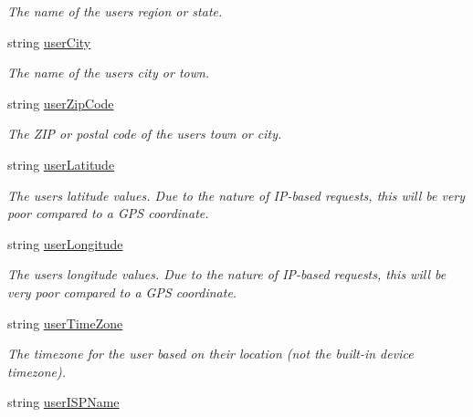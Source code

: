 \begin{DoxyCompactItemize}
\begin{DoxyCompactList}\small\item\em The name of the user\textquotesingle{}s region or state. \end{DoxyCompactList}\item 
string \mbox{\hyperlink{class_bigfoot_d_s_1_1_bigfoot_general_location_finder_a05f1fa53a9892d4de8103fbe16858db2}{user\+City}}
\begin{DoxyCompactList}\small\item\em The name of the user\textquotesingle{}s city or town. \end{DoxyCompactList}\item 
string \mbox{\hyperlink{class_bigfoot_d_s_1_1_bigfoot_general_location_finder_a4db74322da4080833664faf84768f92c}{user\+Zip\+Code}}
\begin{DoxyCompactList}\small\item\em The Z\+IP or postal code of the user\textquotesingle{}s town or city. \end{DoxyCompactList}\item 
string \mbox{\hyperlink{class_bigfoot_d_s_1_1_bigfoot_general_location_finder_a821155456db788ade1ad0c53b30a4e82}{user\+Latitude}}
\begin{DoxyCompactList}\small\item\em The user\textquotesingle{}s latitude values. Due to the nature of I\+P-\/based requests, this will be very poor compared to a G\+PS coordinate. \end{DoxyCompactList}\item 
string \mbox{\hyperlink{class_bigfoot_d_s_1_1_bigfoot_general_location_finder_a6c99e8e8c60a7f003dfcf0474c77ef41}{user\+Longitude}}
\begin{DoxyCompactList}\small\item\em The user\textquotesingle{}s longitude values. Due to the nature of I\+P-\/based requests, this will be very poor compared to a G\+PS coordinate. \end{DoxyCompactList}\item 
string \mbox{\hyperlink{class_bigfoot_d_s_1_1_bigfoot_general_location_finder_ab443ecc804537beca860e12c3ff6c5cd}{user\+Time\+Zone}}
\begin{DoxyCompactList}\small\item\em The timezone for the user based on their location (not the built-\/in device timezone). \end{DoxyCompactList}\item 
string \mbox{\hyperlink{class_bigfoot_d_s_1_1_bigfoot_general_location_finder_a1269e7e1706072b54b099191ee3c4f59}{user\+I\+S\+P\+Name}}

\end{DoxyCompactItemize}
